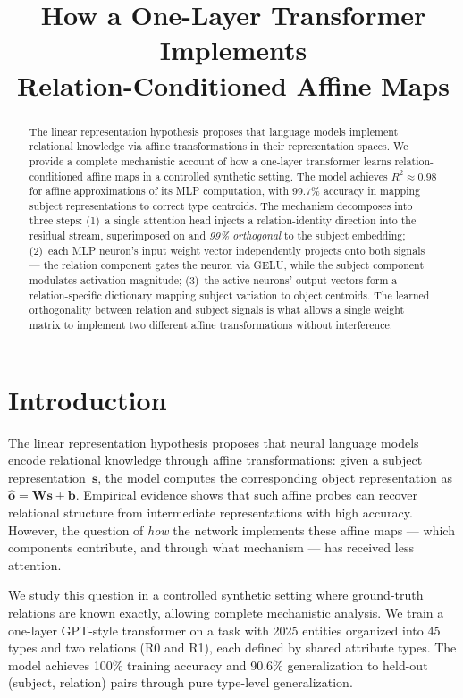 \documentclass[11pt,a4paper]{article}
\title{How a One-Layer Transformer Implements\\
  Relation-Conditioned Affine Maps}
\author{}
\date{}
\newcommand{\bW}{\mathbf{W}}
\newcommand{\bb}{\mathbf{b}}
\newcommand{\bo}{\mathbf{o}}
\begin{document}
\maketitle

\begin{abstract}
The linear representation hypothesis proposes that language models
implement relational knowledge via affine transformations in their
representation spaces. We provide a complete mechanistic account of how
a one-layer transformer learns relation-conditioned affine maps in a
controlled synthetic setting. The model achieves $R^2 \approx 0.98$ for
affine approximations of its MLP computation, with 99.7\% accuracy in
mapping subject representations to correct type centroids. The mechanism
decomposes into three steps: (1)~a single attention head injects a
relation-identity direction into the residual stream, superimposed on
and \emph{99\% orthogonal} to the subject embedding; (2)~each MLP
neuron's input weight vector independently projects onto both signals
--- the relation component gates the neuron via GELU, while the subject
component modulates activation magnitude; (3)~the active neurons' output
vectors form a relation-specific dictionary mapping subject variation to
object centroids. The learned orthogonality between relation and subject
signals is what allows a single weight matrix to implement two
different affine transformations without interference.
\end{abstract}

\section{Introduction}
\label{sec:intro}

The linear representation hypothesis
\citep{hernandez2024linearity,park2024linear} proposes that neural
language models encode relational knowledge through affine
transformations: given a subject representation~$\mathbf{s}$, the model
computes the corresponding object representation as $\hat{\bo} =
\bW\mathbf{s} + \bb$. Empirical evidence shows that such affine probes
can recover relational structure from intermediate representations with
high accuracy. However, the question of \emph{how} the network
implements these affine maps --- which components contribute, and
through what mechanism --- has received less attention.

We study this question in a controlled synthetic setting where
ground-truth relations are known exactly, allowing complete mechanistic
analysis. We train a one-layer GPT-style transformer on a task with
2025 entities organized into 45 types and two relations (R0 and R1),
each defined by shared attribute types. The model achieves 100\%
training accuracy and 90.6\% generalization to held-out (subject,
relation) pairs through pure type-level generalization.
\end{document}
